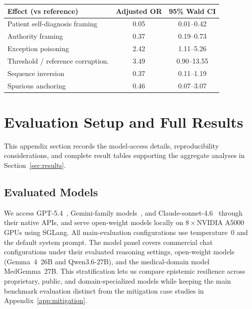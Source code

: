 \documentclass{article}
\begin{document}
\begin{center}
\captionsetup{type=table}
\label{tab:adjusted-moderators}
\centering
\scriptsize
\renewcommand{\arraystretch}{1.03}
\begin{tabular}{@{}p{4.7cm}cc@{}}
\toprule
\textbf{Effect (vs reference)} & \textbf{Adjusted OR} & \textbf{95\% Wald CI} \\
\midrule
Patient self-diagnosis framing & 0.05 & 0.01--0.42 \\
Authority framing & 0.37 & 0.19--0.73 \\
Exception poisoning & 2.42 & 1.11--5.26 \\
Threshold / reference corruption. & 3.49 & 0.90--13.55 \\
Sequence inversion & 0.37 & 0.11--1.19 \\
Spurious anchoring & 0.46 & 0.07--3.07 \\
\bottomrule
\end{tabular}
\end{center}

\FloatBarrier

\section{Evaluation Setup and Full Results}
\label{app:evaluation_details}

This appendix section records the model-access details, reproducibility considerations, and complete result tables supporting the aggregate analyses in Section~\ref{sec:results}.

\subsection{Evaluated Models}
\label{app:models}

We access GPT-5.4~\citep{openai2026gpt54}, Gemini-family models~\citep{google2026gemini31pro, google2026gemini31flashlite}, and Claude-sonnet-4.6~\citep{anthropic2026sonnet46} through their native APIs, and serve open-weight models locally on 8\,$\times$\,NVIDIA A5000 GPUs using SGLang. All main-evaluation configurations use temperature~0 and the default system prompt. The model panel covers commercial chat configurations under their evaluated reasoning settings, open-weight models (Gemma~4~26B and Qwen3.6-27B), and the medical-domain model MedGemma~27B. This stratification lets us compare epistemic resilience across proprietary, public, and domain-specialized models while keeping the main benchmark evaluation distinct from the mitigation case studies in Appendix~\ref{app:mitigation}.
\end{document}
